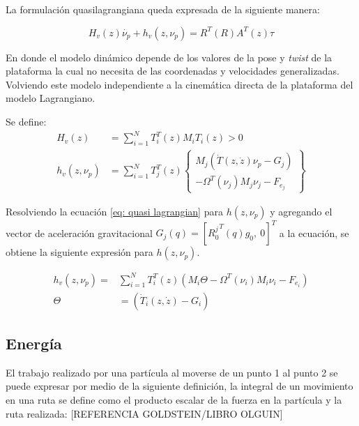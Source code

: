La formulación quasilagrangiana queda expresada de la 
siguiente manera:

\begin{equation}\label{eq: quasi lagrangian}
  H_v(z)\dot{\nu_p}+h_v(z,\nu_p) = R^T(R) A^T(z)\tau
\end{equation}


En donde el modelo dinámico depende de los valores de la pose y \emph{twist} de la plataforma la cual no necesita de las coordenadas y velocidades generalizadas. Volviendo este modelo independiente a la cinemática directa de la plataforma del modelo Lagrangiano.

Se define:
\begin{subequations}
 \begin{align}
  H_v(z) &= \sum_{i=1}^N T_i^T (z) M_i T_i(z) > 0\\
  h_v (z, \nu_p) &= \sum_{i=1}^N T_j^T (z) \begin{Bmatrix}
                                           M_j (\dot T(z, \dot z)\nu_p -G_j) \\
                                           - \Omega^T (\nu_j) M_j \nu_j - F_{e_j}
                                          \end{Bmatrix}
 \end{align}
\end{subequations}

Resolviendo la ecuación \eqref{eq: quasi lagrangian}
para $h(z,\nu_p)$ y agregando el vector de 
aceleración gravitacional 
$G_j(q) = [{R_0^j}^T(q)g_0, \ 0 ]^T$ a la ecuación, 
se obtiene la siguiente expresión para $h(z,\nu_p)$.

\begin{subequations}
\begin{align}
 h_v(z,\nu_p) = & \sum_{i=1}^N T_i^T(z)  \left( M_i \Theta  - \Omega^T(\nu_i)M_i\nu_i - F_{e_i} \right)\\
 \Theta & = \left(\dot T_i (z,\dot z) - G_i \right)
\end{align}
\end{subequations}


\subsection{Energía}
El trabajo realizado por una partícula al moverse de un punto 1 al punto 2 se puede expresar por medio de la siguiente definición, la integral de un movimiento en una ruta se define como el producto escalar de la fuerza en la partícula y la ruta realizada: [REFERENCIA GOLDSTEIN/LIBRO OLGUIN]

